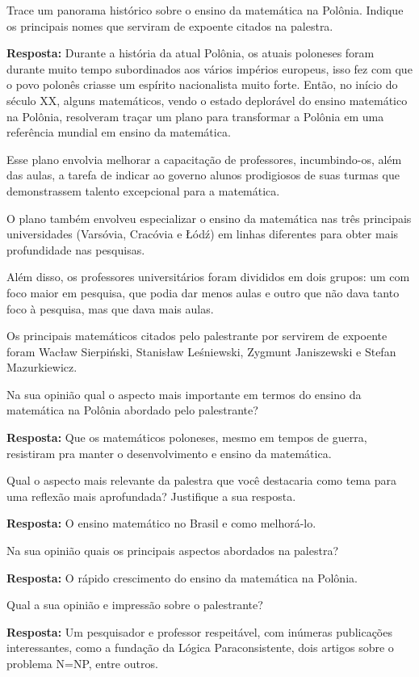 \documentclass{article}
\begin{document}
\begin{enumerate}

{\bf \item Trace um panorama histórico sobre o ensino da matemática na Polônia. Indique os principais nomes que serviram de expoente citados na palestra.}

{\bf Resposta:} Durante a história da atual Polônia, os atuais poloneses foram durante muito tempo subordinados aos vários impérios europeus, isso fez com que o povo polonês criasse um espírito nacionalista muito forte. Então, no início do século XX, alguns matemáticos, vendo o estado deplorável do ensino matemático na Polônia, resolveram traçar um plano para transformar a Polônia em uma referência mundial em ensino da matemática.

Esse plano envolvia melhorar a capacitação de professores, incumbindo-os, além das aulas, a tarefa de indicar ao governo alunos prodigiosos de suas turmas que demonstrassem talento excepcional para a matemática.

O plano também envolveu especializar o ensino da matemática nas três principais universidades (Varsóvia, Cracóvia e Łódź) em linhas diferentes para obter mais profundidade nas pesquisas.

Além disso, os professores universitários foram divididos em dois grupos: um com foco maior em pesquisa, que podia dar menos aulas e outro que não dava tanto foco à pesquisa, mas que dava mais aulas.

Os principais matemáticos citados pelo palestrante por servirem de expoente foram Wacław Sierpiński, Stanisław Leśniewski, Zygmunt Janiszewski e Stefan Mazurkiewicz.

{\bf \item Na sua opinião qual o aspecto mais importante em termos do ensino da matemática na Polônia abordado pelo palestrante?}

{\bf Resposta:} Que os matemáticos poloneses, mesmo em tempos de guerra, resistiram pra manter o desenvolvimento e ensino da matemática.

{\bf \item Qual o aspecto mais relevante da palestra que você destacaria como tema para uma reflexão mais aprofundada? Justifique a sua resposta.}

{\bf Resposta:} O ensino matemático no Brasil e como melhorá-lo.

{\bf \item Na sua opinião quais os principais aspectos abordados na palestra?}

{\bf Resposta:} O rápido crescimento do ensino da matemática na Polônia.

{\bf \item Qual a sua opinião e impressão sobre o palestrante?}

{\bf Resposta:} Um pesquisador e professor respeitável, com inúmeras publicações interessantes, como a fundação da Lógica Paraconsistente, dois artigos sobre o problema N=NP, entre outros.

\end{enumerate}
\end{document}
